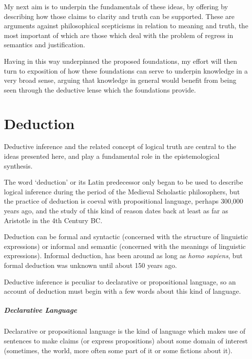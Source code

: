 \documentclass[10pt,titlepage]{book}
\begin{document}
My next aim is to underpin the fundamentals of these ideas, by offering by describing how those claims to clarity and truth can be supported.
These are arguments against philosophical scepticisms in relation to meaning and truth, the most important of which are those which deal with the problem of regress in semantics and justification.

Having in this way underpinned the proposed foundations, my effort will then turn to exposition of how these foundations can serve to underpin knowledge in a very broad sense, arguing that knowledge in general would benefit from being seen through the deductive lense which the foundations provide.

\chapter{Deduction}\label{ChapDeduction}

Deductive inference and the related concept of logical truth are central to the ideas presented here, and play a fundamental role in the epistemological synthesis.

The word `deduction' or its Latin predecessor only began to be used to describe logical inference during the period of the Medieval Scholastic philosophers, but the practice of deduction is coeval with propositional language, perhaps 300,000 years ago, and the study of this kind of reason dates back at least as far as Aristotle in the 4th Century BC.

Deduction can be formal and syntactic (concerned with the structure of linguistic expressions)  or informal and semantic (concerned with the meanings of linguistic expressions).
Informal deduction, has been around as long as \emph{homo sapiens}, but formal deduction was unknown until about 150 years ago.

Deductive inference is peculiar to declarative or propositional language, so an account of deduction must begin with a few words about this kind of language.

\paragraph{Declarative Language}

Declarative or propositional language is the kind of language which makes use of sentences to make claims (or express propositions) about some domain of interest (sometimes, the world, more often some part of it or some fictions about it).
\end{document}
